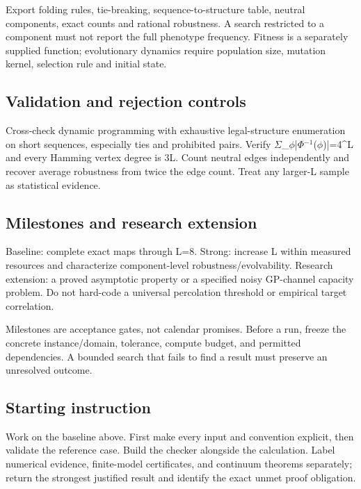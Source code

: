 \documentclass[
  11pt,
]{article}
\begin{document}
Export folding rules, tie-breaking, sequence-to-structure table, neutral
components, exact counts and rational robustness. A search restricted to
a component must not report the full phenotype frequency. Fitness is a
separately supplied function; evolutionary dynamics require population
size, mutation kernel, selection rule and initial state.

\subsection{Validation and rejection controls}

Cross-check dynamic programming with exhaustive legal-structure
enumeration on short sequences, especially ties and prohibited pairs.
Verify
\ensuremath{\Sigma}\_\ensuremath{\phi}|\ensuremath{\Phi}\ensuremath{{}^{-1}}(\ensuremath{\phi})|=4\textasciicircum{}L
and every Hamming vertex degree is 3L. Count neutral edges independently
and recover average robustness from twice the edge count. Treat any
larger-L sample as statistical evidence.

\subsection{Milestones and research extension}

Baseline: complete exact maps through L=8. Strong: increase L within
measured resources and characterize component-level
robustness/evolvability. Research extension: a proved asymptotic
property or a specified noisy GP-channel capacity problem. Do not
hard-code a universal percolation threshold or empirical target
correlation.

Milestones are acceptance gates, not calendar promises. Before a run,
freeze the concrete instance/domain, tolerance, compute budget, and
permitted dependencies. A bounded search that fails to find a result
must preserve an unresolved outcome.

\subsection{Starting instruction}

Work on the baseline above. First make every input and convention
explicit, then validate the reference case. Build the checker alongside
the calculation. Label numerical evidence, finite-model certificates,
and continuum theorems separately; return the strongest justified result
and identify the exact unmet proof obligation.
\end{document}
